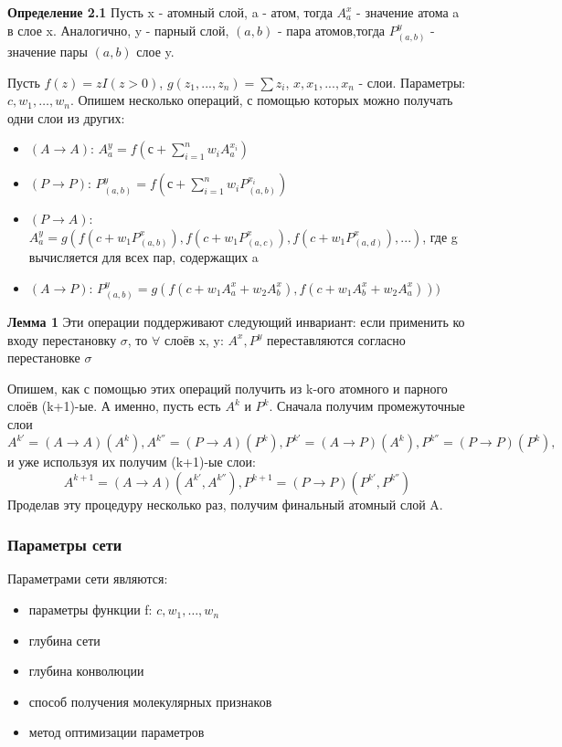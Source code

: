\documentclass[12pt,twoside]{article}
\begin{document}
	\textbf{Определение 2.1} Пусть x - атомный слой, a - атом, тогда $A^x_a$ - значение атома a в слое x. Аналогично, y - парный слой, $(a, b)$ - пара атомов,тогда $P^y_{(a, b)}$ - значение пары $(a, b)$ слое y.
	
	Пусть $f(z) = z I(z > 0)$, $g(z_1,..., z_n) = \sum{z_i}$, $x, x_1,...,x_n$ - слои. Параметры: $c, w_1,\dots,w_n$. Опишем несколько операций, с помощью которых можно получать одни слои из других:
	\begin{itemize}
	\item $(A\rightarrow A)$: $A^y_a = f(с+\sum_{i=1}^n {w_i A^{x_i}_a})$
	\item $(P\rightarrow P)$: $P^y_{(a, b)} = f(с+\sum_{i=1}^n {w_i P^{x_i}_{(a, b)}})$
	\item $(P\rightarrow A)$: $A^y_a = g(f(c + w_1 P^x_{(a, b)}), f(c + w_1 P^x_{(a, c)}), f(c + w_1 P^x_{(a, d)}),...)$, где g вычисляется для всех пар, содержащих a
	\item $(A\rightarrow P)$: $P^y_{(a, b)} = g(f(c + w_1 A^x_a + w_2 A^x_b), f(c + w_1 A^x_b + w_2 A^x_a)))$
	\end{itemize}
	
	\textbf{Лемма 1} Эти операции поддерживают следующий инвариант: если применить ко входу перестановку $\sigma$, то $\forall$ слоёв x, y: $A^x, P^y$ переставляются согласно перестановке $\sigma$
	
	Опишем, как с помощью этих операций получить из k-ого атомного и парного слоёв (k+1)-ые. А именно, пусть есть $A^k$ и $P^k$. Сначала получим промежуточные слои $$A^{k'} = (A\rightarrow A)(A^k), A^{k''}=(P\rightarrow A)(P^k), P^{k'}=(A \rightarrow P)(A^k), P^{k''}=(P\rightarrow P)(P^k),$$ и уже используя их получим (k+1)-ые слои: $$A^{k+1} = (A\rightarrow A)(A^{k'}, A^{k''}), P^{k+1} = (P\rightarrow P)(P^{k'}, P^{k''})$$
Проделав эту процедуру несколько раз, получим финальный атомный слой A.

\subsubsection{Параметры сети}
Параметрами сети являются:
\begin{itemize}
\item параметры функции f: $c, w_1,\dots,w_n$
\item глубина сети
\item глубина конволюции
\item способ получения молекулярных признаков
\item метод оптимизации параметров
\end{itemize}
\end{document}

